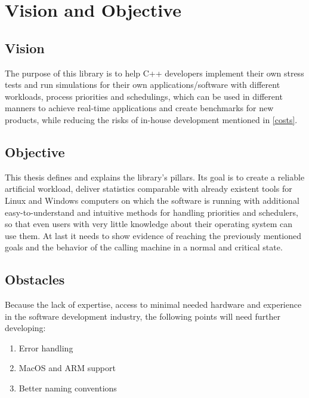 \section{Vision and Objective}
\subsection{Vision}
The purpose of this library is to help C++ developers implement their own stress tests and run simulations for their own applications/software with different workloads, process priorities and schedulings, which can be used in different manners to achieve real-time applications and create benchmarks for new products, while reducing the risks of in-house development mentioned in \ref{costs}.
\subsection{Objective}
\label{objective}
This thesis defines and explains the library's pillars. Its goal is to create a reliable artificial workload, deliver statistics comparable with already existent tools for Linux and Windows computers on which the software is running with additional easy-to-understand and intuitive methods for handling priorities and schedulers, so that even users with very little knowledge about their operating system can use them. At last it needs to show evidence of reaching the previously mentioned goals and the behavior of the calling machine in a normal and critical state.  
\subsection{Obstacles}
Because the lack of expertise, access to minimal needed hardware and experience in the software development industry, the following points will need further developing:
\begin{enumerate}
	\item Error handling
	\item MacOS and ARM support
	\item Better naming conventions
\end{enumerate}

